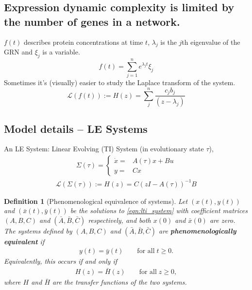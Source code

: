 \documentclass[11 pt]{article}
\newcommand{\1}{\mathbbm{1}}
\newtheorem{definition}{Definition}
\begin{document}
    \subsection{Expression dynamic complexity is limited by the number of genes in a network.}
    $f(t)$ describes protein concentrations at time $t$, $\lambda_{j}$ is the $j$th eigenvalue of the GRN and $\xi_{j}$ is a variable.
      \begin{equation*}
        f(t) = \sum_{j=1}^{n} e^{\lambda_{j}t} \xi_{j}
      \end{equation*}
      Sometimes it's (visually) easier to study the Laplace transform of the system. 
      \begin{equation*}
        \mathcal{L}(f(t)) := H(z) = \sum_{j}^{n} \frac{c_{j} b_{j}}{(z- \lambda_{j})}
      \end{equation*}

  \subsection{Model details -- LE Systems}
      An LE System: Linear Evolving (TI) System (in evolutionary state $\tau$), 
    \begin{align*}
      \Sigma(\tau) = \left\{ \begin{array}{cc} \dot{x} =& A(\tau)x + Bu \\
      y =& Cx \end{array} \right.
    \end{align*}
    \begin{align*}
      \mathcal{L}(\Sigma(\tau)) := H(z) = C \left(zI - A(\tau) \right)^{-1} B
    \end{align*}

      \begin{definition}[Phenomenological equivalence of systems]
    Let $(x(t),y(t))$ and $(\bar x(t),\bar y(t))$ be the solutions to \eqref{eqn:lti_system}
    with coefficient matrices $(A,B,C)$ and $(\bar A,\bar B,\bar C)$ respectively,
    and both $x(0)$ and $\bar x(0)$ are zero. 
    The systems defined by $(A,B,C)$ and $(\bar A,\bar B,\bar C)$ are
    \textbf{phenomenologically equivalent} 
    if
    \begin{align*}
        y(t) = \bar y(t) \qquad \text{for all} \; t \ge 0.
    \end{align*}
    Equivalently, this occurs if and only if
    \begin{align*}
        H(z) = \bar H(z)  \qquad \text{for all} \; z \ge 0,
    \end{align*}
    where $H$ and $\bar H$ are the transfer functions of the two systems.
\end{definition}
\end{document}
